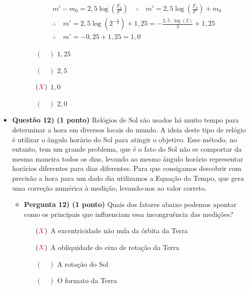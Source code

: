 \documentclass[a4paper, 12pt]{article}
\newcommand{\red}[1]{\textcolor{red}{#1}}
\begin{document}
\begin{flushleft}
\begin{itemize}
\begin{itemize}
{\begin{itemize}
                                \begin{equation*} \begin{gathered}
                                    m'-m_0=2,5 \log \left(\frac{F_0}{F'}\right) \quad \therefore \quad m'=2,5 \log \left(\frac{F_0}{F'}\right)+m_0\\
                                    \therefore \quad m'=2,5 \log \left(2^{-\frac{1}{3}}\right)+1,25=-\frac{2,5 \cdot \log (2)}{3}+1,25\\
                                    \therefore \quad m'=-0,25 +1,25 =1,0
                                \end{gathered} \end{equation*}
                        \end{itemize}}
                        \begin{itemize}
                            \item[$(\quad)$] $1,25$
                            \item[$(\quad)$] $2,5$
                            \item[$(\red{X})$] $1,0$
                            \item[$(\quad)$] $2,0$
                        \end{itemize}
                \end{itemize}
            
            \item \textbf{Questão 12) (1 ponto)} Relógios de Sol são usados há muito tempo para determinar a hora em diversos locais do mundo. A ideia deste tipo de relógio é utilizar o ângulo horário do Sol para atingir o objetivo. Esse método, no entanto, tem um grande problema, que é o fato do Sol não se comportar da mesma maneira todos os dias, levando ao mesmo ângulo horário representar horários diferentes para dias diferentes. Para que consigamos descobrir com precisão a hora para um dado dia utilizamos a Equação do Tempo, que gera uma correção numérica à medição, levando-nos ao valor correto.
                \begin{itemize}
                    \item \textbf{Pergunta 12) (1 ponto)} Quais dos fatores abaixo podemos apontar como os principais que influenciam essa incongruência das medições?
                        \begin{itemize}
                            \item[$(\red{X})$] A excentricidade não nula da órbita da Terra
                            \item[$(\red{X})$] A obliquidade do eixo de rotação da Terra
                            \item[$(\quad)$] A rotação do Sol
                            \item[$(\quad)$] O formato da Terra
                        \end{itemize}
                \end{itemize}
            

\end{itemize}
\end{flushleft}
\end{document}
